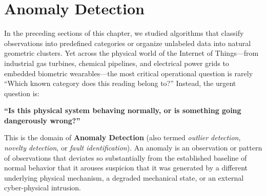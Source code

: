 \section{Anomaly Detection}\label{sec:anomaly_detection}

In the preceding sections of this chapter, we studied algorithms that classify observations into predefined categories or organize unlabeled data into natural geometric clusters. Yet across the physical world of the Internet of Things---from industrial gas turbines, chemical pipelines, and electrical power grids to embedded biometric wearables---the most critical operational question is rarely ``Which known category does this reading belong to?'' Instead, the urgent question is:
\begin{center}
\textbf{``Is this physical system behaving normally, or is something going dangerously wrong?''}
\end{center}

This is the domain of \textbf{Anomaly Detection} (also termed \textit{outlier detection}, \textit{novelty detection}, or \textit{fault identification}). An anomaly is an observation or pattern of observations that deviates so substantially from the established baseline of normal behavior that it arouses suspicion that it was generated by a different underlying physical mechanism, a degraded mechanical state, or an external cyber-physical intrusion.

